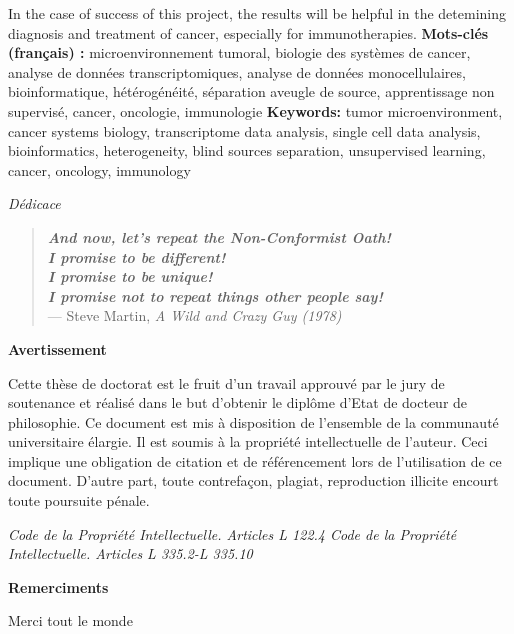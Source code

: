 \documentclass[12pt,]{book}
\theoremstyle{definition}
\theoremstyle{definition}
\theoremstyle{definition}
\theoremstyle{remark}
\begin{document}
\begin{titlepage}
In the case of success of this project, the results will be helpful in the detemining diagnosis and treatment of cancer, especially for immunotherapies.
\vskip 1cm
\noindent
\textbf{Mots-clés (français) :} microenvironnement tumoral, biologie des systèmes de cancer, analyse de données transcriptomiques, analyse de données monocellulaires, bioinformatique, hétérogénéité,  séparation aveugle de source, apprentissage non supervisé, cancer, oncologie, immunologie
\vskip 1cm
\noindent
\textbf{Keywords:} tumor microenvironment, cancer systems biology, transcriptome data analysis, single cell data analysis, bioinformatics, heterogeneity, blind sources separation, unsupervised learning, cancer, oncology, immunology


\newpage
\emph{Dédicace}
\vspace*{\fill}

 \begin{quote}
\emph{\textbf{And now, let's repeat the Non-Conformist Oath!\\
I promise to be different!\\
I promise to be unique!\\
I promise not to repeat things other people say!}}\\
— Steve Martin, \textit{A Wild and Crazy Guy (1978)}\\
 \end{quote}
 \vspace*{\fill}


\newpage
\thispagestyle{empty}
\begin{center}
\large{\textbf{Avertissement}}
\end{center}
\vspace{2cm}
Cette thèse de doctorat est le fruit d’un travail approuvé par le jury de soutenance et
réalisé dans le but d’obtenir le diplôme d’Etat de docteur de philosophie. Ce document
est mis à disposition de l’ensemble de la communauté universitaire élargie.
Il est soumis à la propriété intellectuelle de l’auteur. Ceci implique une obligation de
citation et de référencement lors de l’utilisation de ce document.
D’autre part, toute contrefaçon, plagiat, reproduction illicite encourt toute poursuite
pénale.
\vspace*{\fill}

\emph{Code de la Propriété Intellectuelle. Articles L 122.4 \newline
Code de la Propriété Intellectuelle. Articles L 335.2-L 335.10}


\newpage
\thispagestyle{empty}
\begin{center}
\large{\textbf{Remerciments}}
\end{center}
\vspace{2cm}
Merci tout le monde

\end{titlepage}
\end{document}
